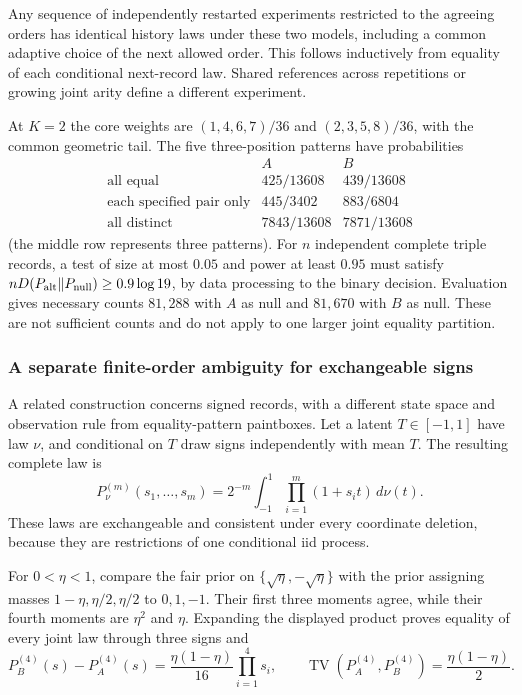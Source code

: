 Any sequence of independently restarted experiments restricted to the agreeing orders has identical history laws under these two models, including a common adaptive choice of the next allowed order. This follows inductively from equality of each conditional next-record law. Shared references across repetitions or growing joint arity define a different experiment.

At $K=2$ the core weights are $(1,4,6,7)/36$ and $(2,3,5,8)/36$, with the common geometric tail. The five three-position patterns have probabilities
\[
\begin{array}{c|cc}
 & A&B\\\hline
\text{all equal}&425/13608&439/13608\\
\text{each specified pair only}&445/3402&883/6804\\
\text{all distinct}&7843/13608&7871/13608
\end{array}
\]
(the middle row represents three patterns). For $n$ independent complete triple records, a test of size at most $0.05$ and power at least $0.95$ must satisfy
$nD(P_{\rm alt}\|P_{\rm null})\ge0.9\log19$, by data processing to the binary decision. Evaluation gives necessary counts $81{,}288$ with $A$ as null and $81{,}670$ with $B$ as null. These are not sufficient counts and do not apply to one larger joint equality partition.

\subsubsection{A separate finite-order ambiguity for exchangeable signs}
\label{pat:latent-sign-aliases}

A related construction concerns signed records, with a different
state space and observation rule from equality-pattern paintboxes.
Let a latent \(T\in[-1,1]\) have law \(\nu\), and conditional on \(T\)
draw signs independently with mean \(T\).  The resulting complete law is
\[
 P_\nu^{(m)}(s_1,\ldots,s_m)
 =2^{-m}\int_{-1}^1\prod_{i=1}^m(1+s_it)\,d\nu(t).
\]
These laws are exchangeable and consistent under every coordinate
deletion, because they are restrictions of one conditional iid process.

For \(0<\eta<1\), compare the fair prior on
\(\{\sqrt\eta,-\sqrt\eta\}\) with the prior assigning masses
\(1-\eta,\eta/2,\eta/2\) to \(0,1,-1\).  Their first three moments
agree, while their fourth moments are \(\eta^2\) and \(\eta\).
Expanding the displayed product proves equality of every joint law
through three signs and
\[
 P_B^{(4)}(s)-P_A^{(4)}(s)
 =\frac{\eta(1-\eta)}{16}\prod_{i=1}^4s_i,\qquad
 \operatorname{TV}(P_A^{(4)},P_B^{(4)})
 =\frac{\eta(1-\eta)}2.
\]

